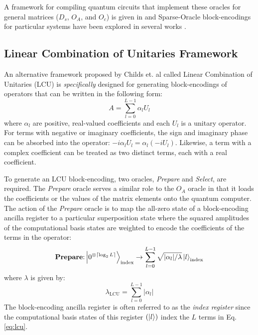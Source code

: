 A framework for compiling quantum circuits that implement these oracles for general matrices ($D_s$, $O_A$, and $O_c$) is given in \cite{camps2024explicit, camps2022fable} and Sparse-Oracle block-encodings for particular systems have been explored in several works \cite{camps2022fable, liu2024efficient, sanavio2024explicit}.

\subsection{Linear Combination of Unitaries Framework}
\label{subsec:lcu}

An alternative framework proposed by Childs et. al \cite{childs2012hamiltonian} called Linear Combination of Unitaries (LCU) is \textit{specifically} designed for generating block-encodings of operators that can be written in the following form:
\begin{equation}
    \label{eq:lcu}
    A = \sum_{l=0}^{L-1} \alpha_l U_l
\end{equation}
where $\alpha_l$ are positive, real-valued coefficients and each $U_l$ is a unitary operator.
For terms with negative or imaginary coefficients, the sign and imaginary phase can be absorbed into the operator: $-i \alpha_l U_l = \alpha_l (-i U_l)$.
Likewise, a term with a complex coefficient can be treated as two distinct terms, each with a real coefficient.

To generate an LCU block-encoding, two oracles, \textit{Prepare} and \textit{Select}, are required. The \textit{Prepare} oracle serves a similar role to the $O_A$ oracle in that it loads the coefficients or the values of the matrix elements onto the quantum computer.
The action of the \textit{Prepare} oracle is to map the all-zero state of a block-encoding ancilla register to a particular superposition state where the squared amplitudes of the computational basis states are weighted to encode the coefficients of the terms in the operator:
\begin{equation}
    \label{eq:prep-state}
    \textbf{Prepare}\text{:} \ket{0^{\otimes \lceil \log_2 L \rceil}}_\text{index} \rightarrow \sum_{l=0}^{L-1} \sqrt{| \alpha_l | / \lambda} \ket{l}_\text{index}
\end{equation}
where $\lambda$ is given by:
\begin{equation}
    \label{eq:lambda-lcu}
    \lambda_\text{LCU} = \sum_{l=0}^{L-1} | \alpha_l |
\end{equation}
The block-encoding ancilla register is often referred to as the \textit{index register} since the computational basis states of this register $(\ket{l})$ index the $L$ terms in Eq. \ref{eq:lcu}.

